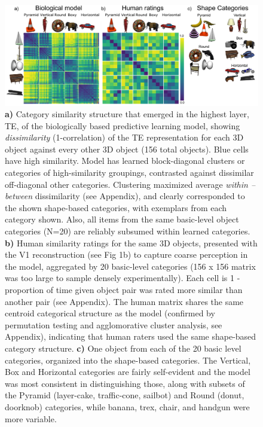 \documentclass[11pt,twoside]{article}
\newif\myifpdf
\begin{document}
\begin{figure}
  \centering\includegraphics[width=6in]{fig_deepleabra_wwi_rsa_leabra_expt1_objs}
  \caption{\footnotesize {\bf a)} Category similarity structure that emerged in the highest layer, TE, of the biologically based predictive learning model, showing \emph{dissimilarity} (1-correlation) of the TE representation for each 3D object against every other 3D object (156 total objects).  Blue cells have high similarity.  Model has learned block-diagonal clusters or categories of high-similarity groupings, contrasted against dissimilar off-diagonal other categories.  Clustering maximized average \emph{within -- between} dissimilarity (see Appendix), and clearly corresponded to the shown shape-based categories, with exemplars from each category shown.  Also, all items from the same basic-level object categories (N=20) are reliably subsumed within learned categories. {\bf b)} Human similarity ratings for the same 3D objects, presented with the V1 reconstruction (see Fig 1b) to capture coarse perception in the model, aggregated by 20 basic-level categories (156 x 156 matrix was too large to sample densely experimentally).  Each cell is 1 - proportion of time given object pair was rated more similar than another pair (see Appendix).  The human matrix shares the same centroid categorical structure as the model (confirmed by permutation testing and agglomorative cluster analysis, see Appendix), indicating that human raters used the same shape-based category structure. {\bf c)} One object from each of the 20 basic level categories, organized into the shape-based categories.  The Vertical, Box and Horizontal categories are fairly self-evident and the model was most consistent in distinguishing those, along with subsets of the Pyramid (layer-cake, traffic-cone, sailbot) and Round (donut, doorknob) categories, while banana, trex, chair, and handgun were more variable.}
  \label{fig.rsa}
\end{figure}
\end{document}
